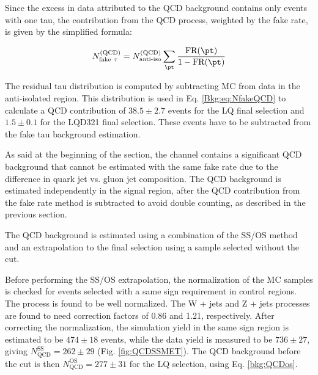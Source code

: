 Since the excess in data attributed to the QCD background contains only events with one tau, the contribution from the QCD process, weighted by the fake rate, is given by the simplified formula:

\begin{equation} N_{\mathrm{fake}~\tau}^{(\text{QCD})} = N_{\text{anti-iso}}^{(\text{QCD})} \sum_{\pt} \frac{\text{FR}(\pt)}{1-\text{FR}(\pt)} \label{Bkg:eq:NfakeQCD} \end{equation}

The residual tau \pt distribution is computed by subtracting MC from data in the anti-isolated region. This distribution is used in Eq. \eqref{Bkg:eq:NfakeQCD} to calculate a QCD contribution of $38.5 \pm 2.7$ events for the LQ final selection and $1.5\pm 0.1$ for the LQD321 final selection. These events have to be subtracted from the fake tau background estimation.

As said at the beginning of the section, the \etau channel contains a significant QCD background that cannot be estimated with the same fake rate due to the difference in quark jet vs. gluon jet composition. The QCD background is estimated independently in the signal region, after the QCD contribution from the fake rate method is subtracted to avoid double counting, as described in the previous section.

The QCD background is estimated using a combination of the SS/OS method and an extrapolation to the final selection using a sample selected without the \MassTJ cut.

Before performing the SS/OS extrapolation, the normalization of the MC samples is checked for events selected with a same sign requirement in control regions. The \ttbar process is found to be well normalized. The W + jets and Z + jets processes are found to need correction factors of 0.86 and 1.21, respectively.
After correcting the normalization, the simulation yield in the same sign region is estimated to be $474\pm 18$ events, while the data yield is measured to be $736\pm 27$, giving $N_{\text{QCD}}^{\text{SS}}=262\pm 29$ (Fig. \ref{fig:QCDSSMET}). The QCD background before the \MassTJ cut is then $N_{\text{QCD}}^{\text{OS}} =277\pm 31$ for the LQ selection, using Eq. \eqref{bkg:QCDos}.

